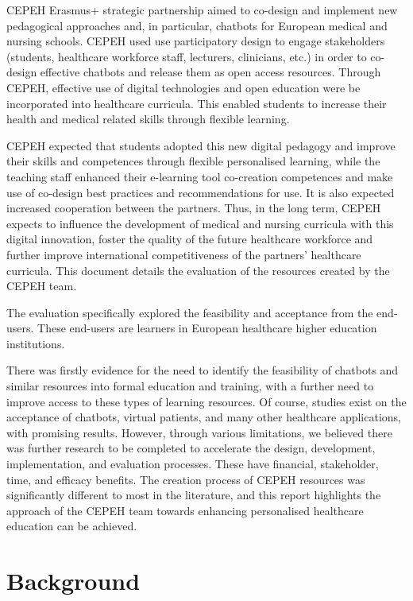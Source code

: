\documentclass[a4paper, nobind]{templates/ociamthesis}
\begin{document}
CEPEH Erasmus+ strategic partnership aimed to co-design and implement new pedagogical approaches and, in particular, chatbots for European medical and nursing schools.
CEPEH used use participatory design to engage stakeholders (students, healthcare workforce staff, lecturers, clinicians, etc.) in order to co-design effective chatbots and release them as open access resources.
Through CEPEH, effective use of digital technologies and open education were be incorporated into healthcare curricula.
This enabled students to increase their health and medical related skills through flexible learning.

CEPEH expected that students adopted this new digital pedagogy and improve their skills and competences through flexible personalised learning, while the teaching staff enhanced their e-learning tool co-creation competences and make use of co-design best practices and recommendations for use.
It is also expected increased cooperation between the partners.
Thus, in the long term, CEPEH expects to influence the development of medical and nursing curricula with this digital innovation, foster the quality of the future healthcare workforce and further improve international competitiveness of the partners' healthcare curricula.
This document details the evaluation of the resources created by the CEPEH team.

The evaluation specifically explored the feasibility and acceptance from the end-users.
These end-users are learners in European healthcare higher education institutions.

There was firstly evidence for the need to identify the feasibility of chatbots and similar resources into formal education and training, with a further need to improve access to these types of learning resources.
Of course, studies exist on the acceptance of chatbots, virtual patients, and many other healthcare applications, with promising results.
However, through various limitations, we believed there was further research to be completed to accelerate the design, development, implementation, and evaluation processes.
These have financial, stakeholder, time, and efficacy benefits.
The creation process of CEPEH resources was significantly different to most in the literature, and this report highlights the approach of the CEPEH team towards enhancing personalised healthcare education can be achieved.

\hypertarget{sec-background}{%
\section*{Background}\label{sec-background}}
\end{document}
